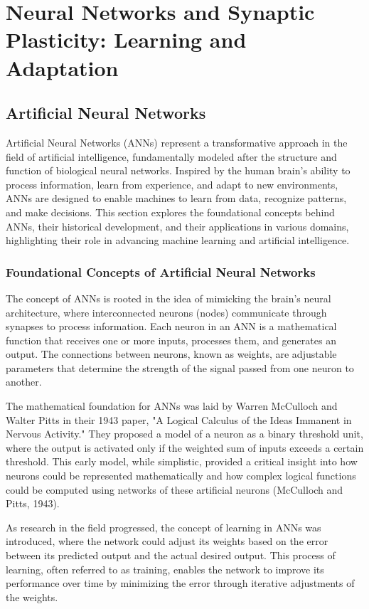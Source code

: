 \documentclass[12pt,twoside]{article}
\begin{document}
\section{Neural Networks and Synaptic Plasticity: Learning and Adaptation}

\subsection{Artificial Neural Networks}

Artificial Neural Networks (ANNs) represent a transformative approach in the field of artificial intelligence, fundamentally modeled after the structure and function of biological neural networks. Inspired by the human brain's ability to process information, learn from experience, and adapt to new environments, ANNs are designed to enable machines to learn from data, recognize patterns, and make decisions. This section explores the foundational concepts behind ANNs, their historical development, and their applications in various domains, highlighting their role in advancing machine learning and artificial intelligence.

\subsubsection{Foundational Concepts of Artificial Neural Networks}

The concept of ANNs is rooted in the idea of mimicking the brain's neural architecture, where interconnected neurons (nodes) communicate through synapses to process information. Each neuron in an ANN is a mathematical function that receives one or more inputs, processes them, and generates an output. The connections between neurons, known as weights, are adjustable parameters that determine the strength of the signal passed from one neuron to another.

The mathematical foundation for ANNs was laid by Warren McCulloch and Walter Pitts in their 1943 paper, "A Logical Calculus of the Ideas Immanent in Nervous Activity." They proposed a model of a neuron as a binary threshold unit, where the output is activated only if the weighted sum of inputs exceeds a certain threshold. This early model, while simplistic, provided a critical insight into how neurons could be represented mathematically and how complex logical functions could be computed using networks of these artificial neurons (McCulloch and Pitts, 1943).

As research in the field progressed, the concept of learning in ANNs was introduced, where the network could adjust its weights based on the error between its predicted output and the actual desired output. This process of learning, often referred to as training, enables the network to improve its performance over time by minimizing the error through iterative adjustments of the weights.
\end{document}
